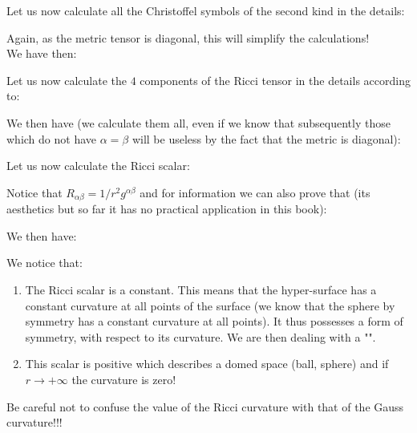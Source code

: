 	\begin{tcolorbox}[colframe=black,colback=white,sharp corners]
	
	Let us now calculate all the Christoffel symbols of the second kind in the details:
	
	Again, as the metric tensor is diagonal, this will simplify the calculations!\\

	We have then:
	
	Let us now calculate the $4$ components of the Ricci tensor in the details according to:
	
	We then have (we calculate them all, even if we know that subsequently those which do not have $\alpha=\beta$ will be useless by the fact that the metric is diagonal):
	
	\end{tcolorbox}
	
	
	\begin{tcolorbox}[colframe=black,colback=white,sharp corners]
	
	Let us now calculate the Ricci scalar:
	
	\begin{tcolorbox}[title=Remark,colframe=black,arc=10pt]
	Notice that $R_{\alpha\beta}=1/r^2 g^{\alpha\beta}$ and for information we can also prove that (its aesthetics but so far it has no practical application in this book):
	
	\end{tcolorbox}
	We then have:
	
	We notice that:
	\begin{enumerate}
		\item The Ricci scalar is a constant. This means that the hyper-surface has a constant curvature at all points of the surface (we know that the sphere by symmetry has a constant curvature at all points). It thus possesses a form of symmetry, with respect to its curvature. We are then dealing with a "".

		\item This scalar is positive which describes a domed space (ball, sphere) and if $r\rightarrow +\infty$ the curvature is zero!
	\end{enumerate}
	\end{tcolorbox}
	\begin{tcolorbox}[title=Remark,colframe=black,arc=10pt]
	Be careful not to confuse the value of the Ricci curvature with that of the Gauss curvature!!!
	\end{tcolorbox}
	
